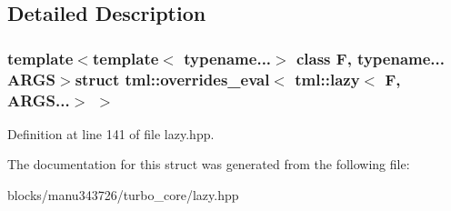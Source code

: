 \subsection{Detailed Description}
\subsubsection*{template$<$template$<$ typename...$>$ class F, typename... A\+R\+G\+S$>$struct tml\+::overrides\+\_\+eval$<$ tml\+::lazy$<$ F, A\+R\+G\+S...$>$ $>$}



Definition at line 141 of file lazy.\+hpp.



The documentation for this struct was generated from the following file\+:\begin{DoxyCompactItemize}
\item 
blocks/manu343726/turbo\+\_\+core/lazy.\+hpp\end{DoxyCompactItemize}
